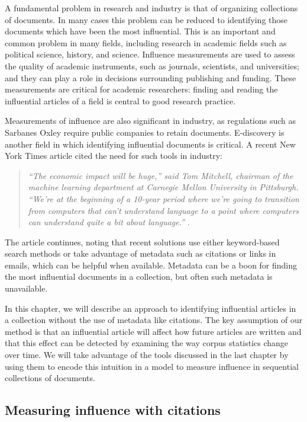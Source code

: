 \label{chapter:influence}

A fundamental problem in research and industry is that of organizing
collections of documents.  In many cases this problem can be reduced
to identifying those documents which have been the most influential.
This is an important and common problem in many fields, including
research in academic fields such as political science, history, and
science.  Influence measurements are used to assess the quality of
academic instruments, such as journals, scientists, and universities;
and they can play a role in decisions surrounding publishing and
funding. These measurements are critical for academic researchers:
finding and reading the influential articles of a field is central to
good research practice.

Measurements of influence are also significant in industry, as
regulations such as Sarbanes Oxley require public companies to retain
documents.  E-discovery is another field in which identifying
influential documents is critical.  A recent New York Times article
cited the need for such tools in industry:
\begin{quote}
  \emph{``The economic impact will be huge,'' said Tom Mitchell, chairman
    of the machine learning department at Carnegie Mellon University
    in Pittsburgh. ``We're at the beginning of a 10-year period where
    we're going to transition from computers that can't understand
    language to a point where computers can understand quite a bit
    about language.''} \citep{markoff:2011}.
\end{quote}
The article continues, noting that recent solutions use either
keyword-based search methods or take advantage of metadata such as
citations or links in emails, which can be helpful when available.
Metadata can be a boon for finding the most influential documents in a
collection, but often such metadata is unavailable.

In this chapter, we will describe an approach to identifying
influential articles in a collection without the use of metadata like
citations.  The key assumption of our method is that an influential
article will affect how future articles are written and that this
effect can be detected by examining the way corpus statistics change
over time.  We will take advantage of the tools discussed in the last
chapter by using them to encode this intuition in a model to measure
influence in sequential collections of documents.

\subsection*{Measuring influence with citations}

